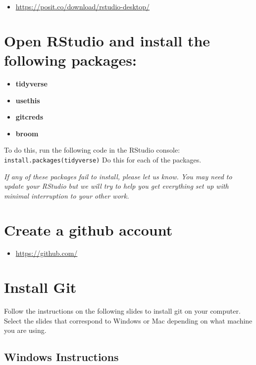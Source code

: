 \documentclass[
]{book}
\providecommand{\tightlist}{%
  \setlength{\itemsep}{0pt}\setlength{\parskip}{0pt}}
\begin{document}
\begin{itemize}
\tightlist
\item
  \url{https://posit.co/download/rstudio-desktop/}
\end{itemize}

\hypertarget{open-rstudio-and-install-the-following-packages}{%
\section{Open RStudio and install the following packages:}\label{open-rstudio-and-install-the-following-packages}}

\begin{itemize}
\tightlist
\item
  \textbf{tidyverse}
\item
  \textbf{usethis}
\item
  \textbf{gitcreds}
\item
  \textbf{broom}
\end{itemize}

To do this, run the following code in the RStudio console:
\texttt{install.packages(\textquotesingle{}tidyverse\textquotesingle{})}
Do this for each of the packages.

\emph{If any of these packages fail to install, please let us know. You may need to update your RStudio but we will try to help you get everything set up with minimal interruption to your other work.}

\hypertarget{create-a-github-account}{%
\section{Create a github account}\label{create-a-github-account}}

\begin{itemize}
\tightlist
\item
  \url{https://github.com/}
\end{itemize}

\hypertarget{install-git}{%
\section{Install Git}\label{install-git}}

Follow the instructions on the following slides to install git on your computer. Select the slides that correspond to Windows or Mac depending on what machine you are using.

\hypertarget{windows-instructions}{%
\subsection{Windows Instructions}\label{windows-instructions}}
\end{document}
